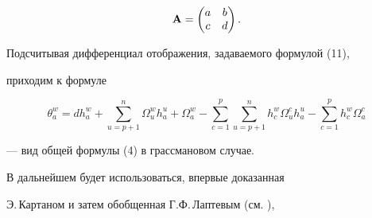 $$


\bold A =


\begin{pmatrix}


a & b \\


c & d


\end{pmatrix}


.


$$


Подсчитывая дифференциал отображения, задаваемого формулой (11),


приходим к формуле


\begin{equation}


\theta^w_a = dh^w_a + \sum_{u=p+1}^n \Omega^w_u h^u_a +


\Omega^w_a - \sum_{c=1}^p \sum_{u=p+1}^n h^w_c \Omega^c_u h^u_a -


\sum_{c=1}^p h^w_c \Omega^c_a


\end{equation}


--- вид общей формулы (4) в грассмановом случае.





В дальнейшем будет использоваться, впервые доказанная


Э.\,Картаном и затем обобщенная Г.Ф.\,Лаптевым (см. \cite{6}),





